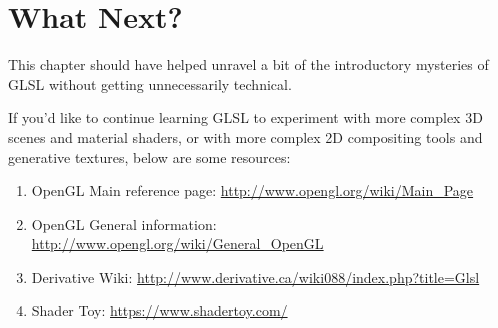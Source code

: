 




\section{What Next?}
\begin{fullwidth}
This chapter should have helped unravel a bit of the introductory mysteries of GLSL without getting unnecessarily technical.

If you'd like to continue learning GLSL to experiment with more complex 3D scenes and material shaders, or with more complex 2D compositing tools and generative textures, below are some resources:

\begin{enumerate}
\item OpenGL Main reference page: \url{http://www.opengl.org/wiki/Main_Page}
\item OpenGL General information: \url{http://www.opengl.org/wiki/General_OpenGL}
\item Derivative Wiki: \url{http://www.derivative.ca/wiki088/index.php?title=Glsl}
\item Shader Toy: \url{https://www.shadertoy.com/}
\end{enumerate}
\end{fullwidth}
